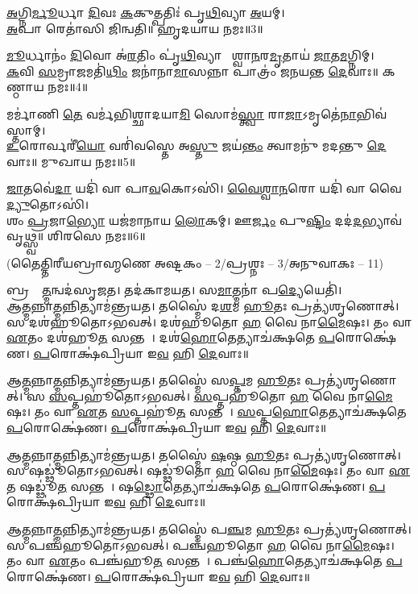 \ul{𑌅}𑌗𑍍𑌨𑌿\ul{𑌰𑍍𑌮𑍂}𑌰𑍍𑌧𑌾 \ul{𑌦𑌿}𑌵𑌃 \ul{𑌕}𑌕𑍁𑌤𑍍𑌪𑌤𑌿𑌃॑ 𑌪𑍃\ul{𑌥𑌿}𑌵𑍍𑌯𑌾 \ul{𑌅}𑌯𑌮𑍍।\\
 \ul{𑌅}𑌪𑌾 𑌰𑍇𑌤𑌾॑𑌸𑌿 𑌜𑌿𑌨𑍍𑌵𑌤𑌿॥ 𑌹𑍃𑌦𑌯𑌾𑌯 𑌨𑌮𑌃॥3॥

\ul{𑌮𑍂}𑌰𑍍𑌧𑌾𑌨𑌂॑ \ul{𑌦𑌿}𑌵𑍋 𑌅॑\ul{𑌰}𑌤𑌿𑌂 𑌪𑍃॑\ul{𑌥𑌿}𑌵𑍍𑌯𑌾 𑌵𑍈᳚𑌶𑍍𑌵𑌾\ul{𑌨}𑌰\ul{𑌮𑍃}𑌤𑌾𑌯॑ \ul{𑌜𑌾}𑌤\ul{𑌮}𑌗𑍍𑌨𑌿𑌮𑍍।\\
\ul{𑌕}𑌵𑌿 \ul{𑌸}𑌮𑍍𑌰𑌾\ul{𑌜}𑌮𑌤𑌿॑\ul{𑌥𑌿𑌂} 𑌜𑌨𑌾॑𑌨𑌾\ul{𑌮𑌾}𑌸𑌨𑍍𑌨𑌾 𑌪𑌾𑌤𑍍𑌰𑌂॑ 𑌜𑌨𑌯𑌨𑍍𑌤 \ul{𑌦𑍇}𑌵𑌾𑌃॥ 𑌕𑌣𑍍𑌠𑌾𑌯 𑌨𑌮𑌃॥4॥

𑌮𑌰𑍍𑌮𑌾॑𑌣𑌿 \ul{𑌤𑍇} 𑌵𑌰𑍍𑌮॑𑌭𑌿𑌶𑍍𑌛𑌾𑌦𑌯𑌾\ul{𑌮𑌿} 𑌸𑍋𑌮॑\ul{𑌸𑍍𑌤𑍍𑌵𑌾} 𑌰𑌾\ul{𑌜𑌾}𑌽𑌮𑍃𑌤𑍇॑\ul{𑌨𑌾}𑌭𑌿\-𑌵॑𑌸𑍍𑌤𑌾𑌮𑍍।\\
\ul{𑌉}𑌰𑍋𑌰𑍍𑌵𑌰𑍀॑\ul{𑌯𑍋} 𑌵𑌰𑌿॑𑌵𑌸𑍍𑌤𑍇 𑌅\ul{𑌸𑍍𑌤𑍁} 𑌜𑌯॑\ul{𑌨𑍍𑌤𑌂} 𑌤𑍍𑌵𑌾𑌮𑌨𑍁॑ 𑌮𑌦𑌨𑍍𑌤𑍁 \ul{𑌦𑍇}𑌵𑌾𑌃॥ 𑌮𑍁𑌖𑌾𑌯 𑌨𑌮𑌃॥5॥

\ul{𑌜𑌾}𑌤𑌵𑍇॑\ul{𑌦𑌾} 𑌯𑌦𑌿॑ 𑌵𑌾 𑌪𑌾\ul{𑌵}𑌕𑍋𑌽𑌸𑌿॑। \ul{𑌵𑍈}\ul{𑌶𑍍𑌵𑌾}\ul{𑌨}𑌰𑍋 𑌯𑌦𑌿॑ 𑌵𑌾 𑌵𑍈\ul{𑌦𑍍𑌯𑍁}𑌤𑍋𑌽𑌸𑌿॑।\\
𑌶𑌂 \ul{𑌪𑍍𑌰}𑌜𑌾\ul{𑌭𑍍𑌯𑍋} 𑌯𑌜॑𑌮𑌾𑌨𑌾𑌯 \ul{𑌲𑍋}𑌕𑌮𑍍। 𑌊\ul{𑌰𑍍𑌜𑌂} 𑌪𑍁\ul{𑌷𑍍𑌟𑌿𑌂} 𑌦𑌦॑\ul{𑌦}𑌭𑍍𑌯𑌾𑌵॑𑌵𑍃𑌥𑍍𑌸𑍍𑌵॥ 𑌶𑌿𑌰𑌸𑍇 𑌨𑌮𑌃॥6॥

{\small \closesection}

\centerline{\normalsize (𑌤𑍈𑌤𑍍𑌤𑌿𑌰𑍀𑌯𑌬𑍍𑌰𑌾𑌹𑍍𑌮𑌣𑍇 𑌅𑌷𑍍𑌟𑌕𑌂 – 2/𑌪𑍍𑌰𑌶𑍍𑌨𑌃 – 3/𑌅𑌨𑍁𑌵𑌾𑌕𑌃 – 11)}

𑌬𑍍𑌰𑌹𑍍𑌮𑌾᳚\ul{𑌤𑍍𑌮}𑌨𑍍𑌵𑌦॑𑌸𑍃𑌜𑌤। 𑌤𑌦॑𑌕𑌾𑌮𑌯𑌤। 𑌸\ul{𑌮𑌾}𑌤𑍍𑌮𑌨𑌾॑ 𑌪\ul{𑌦𑍍𑌯𑍇}𑌯𑍇𑌤𑌿॑।\\
𑌆\ul{𑌤𑍍𑌮}𑌨𑍍𑌨𑌾\ul{𑌤𑍍𑌮}𑌨𑍍𑌨𑌿𑌤𑍍𑌯𑌾𑌮॑𑌨𑍍𑌤𑍍𑌰𑌯𑌤। 𑌤𑌸𑍍𑌮𑍈॑ 𑌦\ul{𑌶}𑌮 \ul{𑌹𑍂}𑌤𑌃 𑌪𑍍𑌰𑌤𑍍𑌯॑𑌶𑍃𑌣𑍋𑌤𑍍। 𑌸 𑌦𑌶॑𑌹𑍂𑌤𑍋𑌽𑌭𑌵𑌤𑍍। 𑌦𑌶॑𑌹𑍂𑌤𑍋 \ul{𑌹} 𑌵𑍈 𑌨𑌾\ul{𑌮𑍈}𑌷𑌃। 𑌤𑌂 𑌵𑌾 \ul{𑌏}𑌤𑌂 𑌦𑌶॑𑌹𑍂\ul{𑌤}\ul{} 𑌸𑌨𑍍𑌤𑌮𑍍᳚। 𑌦𑌶॑\ul{𑌹𑍋}𑌤𑍇𑌤𑍍𑌯𑌾𑌚॑𑌕𑍍𑌷𑌤𑍇 \ul{𑌪}𑌰𑍋𑌕𑍍𑌷𑍇॑𑌣। \ul{𑌪}𑌰𑍋𑌕𑍍𑌷॑𑌪𑍍𑌰𑌿𑌯𑌾 𑌇\ul{𑌵} 𑌹𑌿 \ul{𑌦𑍇}𑌵𑌾𑌃॥

𑌆\ul{𑌤𑍍𑌮}𑌨𑍍𑌨𑌾\ul{𑌤𑍍𑌮}𑌨𑍍𑌨𑌿𑌤𑍍𑌯𑌾𑌮॑𑌨𑍍𑌤𑍍𑌰𑌯𑌤। 𑌤𑌸𑍍𑌮𑍈॑ 𑌸\ul{𑌪𑍍𑌤}𑌮 \ul{𑌹𑍂}𑌤𑌃 𑌪𑍍𑌰𑌤𑍍𑌯॑𑌶𑍃𑌣𑍋𑌤𑍍। 𑌸 \ul{𑌸}𑌪𑍍𑌤𑌹𑍂॑𑌤𑍋𑌽𑌭𑌵𑌤𑍍। \ul{𑌸}𑌪𑍍𑌤𑌹𑍂॑𑌤𑍋 \ul{𑌹} 𑌵𑍈 𑌨𑌾\ul{𑌮𑍈}𑌷𑌃। 𑌤𑌂 𑌵𑌾 \ul{𑌏}𑌤 \ul{𑌸}𑌪𑍍𑌤𑌹𑍂॑\ul{𑌤}\ul{} 𑌸𑌨𑍍𑌤𑌮𑍍᳚। \ul{𑌸}𑌪𑍍𑌤\ul{𑌹𑍋}𑌤𑍇𑌤𑍍𑌯𑌾𑌚॑𑌕𑍍𑌷𑌤𑍇 \ul{𑌪}𑌰𑍋𑌕𑍍𑌷𑍇॑𑌣। \ul{𑌪}𑌰𑍋𑌕𑍍𑌷॑𑌪𑍍𑌰𑌿𑌯𑌾 𑌇\ul{𑌵} 𑌹𑌿 \ul{𑌦𑍇}𑌵𑌾𑌃॥

𑌆\ul{𑌤𑍍𑌮}𑌨𑍍𑌨𑌾\ul{𑌤𑍍𑌮}𑌨𑍍𑌨𑌿𑌤𑍍𑌯𑌾𑌮॑𑌨𑍍𑌤𑍍𑌰𑌯𑌤। 𑌤𑌸𑍍𑌮𑍈॑ \ul{𑌷}𑌷𑍍𑌠 \ul{𑌹𑍂}𑌤𑌃 𑌪𑍍𑌰𑌤𑍍𑌯॑𑌶𑍃𑌣𑍋𑌤𑍍। 𑌸 𑌷𑌡𑍍𑌢𑍂॑𑌤𑍋𑌽𑌭𑌵𑌤𑍍। 𑌷𑌡𑍍𑌢𑍂॑𑌤𑍋 \ul{𑌹} 𑌵𑍈 𑌨𑌾\ul{𑌮𑍈}𑌷𑌃। 𑌤𑌂 𑌵𑌾 \ul{𑌏}𑌤 𑌷𑌡𑍍𑌢𑍂॑\ul{𑌤}\ul{} 𑌸𑌨𑍍𑌤𑌮𑍍᳚। 𑌷\ul{𑌡𑍍𑌢𑍋}𑌤𑍇𑌤𑍍𑌯𑌾𑌚॑𑌕𑍍𑌷𑌤𑍇 \ul{𑌪}𑌰𑍋𑌕𑍍𑌷𑍇॑𑌣। \ul{𑌪}𑌰𑍋𑌕𑍍𑌷॑𑌪𑍍𑌰𑌿𑌯𑌾 𑌇\ul{𑌵} 𑌹𑌿 \ul{𑌦𑍇}𑌵𑌾𑌃॥

𑌆\ul{𑌤𑍍𑌮}𑌨𑍍𑌨𑌾\ul{𑌤𑍍𑌮}𑌨𑍍𑌨𑌿𑌤𑍍𑌯𑌾𑌮॑𑌨𑍍𑌤𑍍𑌰𑌯𑌤। 𑌤𑌸𑍍𑌮𑍈॑ 𑌪\ul{𑌞𑍍𑌚}𑌮 \ul{𑌹𑍂}𑌤𑌃 𑌪𑍍𑌰𑌤𑍍𑌯॑𑌶𑍃𑌣𑍋𑌤𑍍। 𑌸 𑌪𑌞𑍍𑌚॑𑌹𑍂𑌤𑍋𑌽𑌭𑌵𑌤𑍍। 𑌪𑌞𑍍𑌚॑𑌹𑍂𑌤𑍋 \ul{𑌹} 𑌵𑍈 𑌨𑌾\ul{𑌮𑍈}𑌷𑌃। 𑌤𑌂 𑌵𑌾 \ul{𑌏}𑌤𑌂 𑌪𑌞𑍍𑌚॑𑌹𑍂\ul{𑌤}\ul{} 𑌸𑌨𑍍𑌤𑌮𑍍᳚। 𑌪𑌞𑍍𑌚॑\ul{𑌹𑍋}𑌤𑍇𑌤𑍍𑌯𑌾𑌚॑𑌕𑍍𑌷𑌤𑍇 \ul{𑌪}𑌰𑍋𑌕𑍍𑌷𑍇॑𑌣। \ul{𑌪}𑌰𑍋𑌕𑍍𑌷॑𑌪𑍍𑌰𑌿𑌯𑌾 𑌇\ul{𑌵} 𑌹𑌿 \ul{𑌦𑍇}𑌵𑌾𑌃॥

